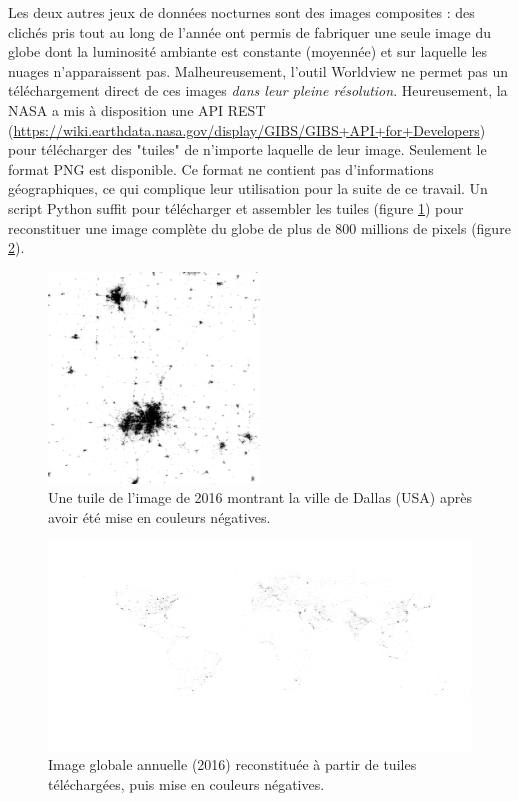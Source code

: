\documentclass[a4paper, 11pt]{report}
\begin{document}
Les deux autres jeux de données nocturnes sont des images composites : des clichés pris tout au long de l'année ont permis de fabriquer une seule image du globe dont la luminosité ambiante est constante (moyennée) et sur laquelle les nuages n'apparaissent pas. Malheureusement, l'outil Worldview ne permet pas un téléchargement direct de ces images \textit{dans leur pleine résolution}. Heureusement, la NASA a mis à disposition une API REST (\url{https://wiki.earthdata.nasa.gov/display/GIBS/GIBS+API+for+Developers}) pour télécharger des "tuiles" de n'importe laquelle de leur image. Seulement le format PNG est disponible. Ce format ne contient pas d'informations géographiques, ce qui complique leur utilisation pour la suite de ce travail. Un script Python suffit pour télécharger et assembler les tuiles (figure \ref{nasa-worldview-tile}) pour reconstituer une image complète du globe de plus de 800 millions de pixels (figure \ref{nasa-worldview-tiles}).

\begin{figure}[h]
	\centering
	\includegraphics[width=0.5\textwidth]{img/018-012.png}
	\caption{Une tuile de l'image de 2016 montrant la ville de Dallas (USA) après avoir été mise en couleurs négatives.}
	\label{nasa-worldview-tile}
\end{figure}

\begin{figure}
	\centering
	\includegraphics[width=0.8\paperheight, angle=-90, origin=c]{img/tiles_2016_zoom6.png}
	\caption{Image globale annuelle (2016) reconstituée à partir de tuiles téléchargées, puis mise en couleurs négatives.}
	\label{nasa-worldview-tiles}
\end{figure}
\end{document}
